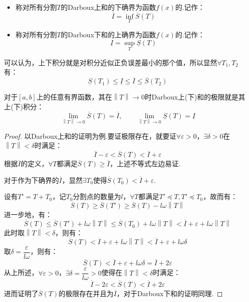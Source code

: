 \begin{definition}
    \begin{itemize}
        \item 称对所有分割$T$的Darboux上和的下确界为函数$f(x)$的.记作：
        \[\overline{I} = \inf_{T} \overline{S}(T)\]
        \item 称对所有分割$T$的Darboux下和的上确界为函数$f(x)$的.记作：
        \[\underline{I} = \sup_{T} \underline{S}(T)\]
    \end{itemize}
\end{definition}

可以认为，上下积分就是对积分近似正负误差最小的那个值，所以显然$\forall T_1,T_2$有：
\[\underline{S}(T_1) \leqslant \underline{I} \leqslant \overline{I} \leqslant \overline{S}(T_2)\]

\begin{theorem}
    对于$[a,b]$上的任意有界函数，其在$\left\|T\right\| \to 0$时Darboux上(下)和的极限就是其上(下)积分：
    \[\lim_{\left\|T\right\| \to 0}\overline{S}(T) = \overline{I},\qquad \lim_{\left\|T\right\| \to 0}\underline{S}(T) = \underline{I}\]
\end{theorem}

\begin{proof}
    以Darboux上和的证明为例.要证极限存在，就要证$\forall \varepsilon > 0$，$\exists \delta > 0$在$\left\|T\right\| < \delta$时满足：
    \[\overline{I} - \varepsilon < \overline{S}(T) < \overline{I} + \varepsilon\]
    根据$\overline{I}$的定义，$\forall T$都满足$\overline{S}(T) \geqslant \overline{I}$，上述不等式左边易证.

    对于作为下确界的$\overline{I}$，显然$\exists T_0$使得$\overline{S}(T_0) < \overline{I} + \varepsilon$.

    设有$T' = T + T_0$，记$T_0$分割点的数量为$l$，$\forall T$都满足$T' \preceq T,T' \preceq T_0$，故而有：
    \[\overline{S}(T) \geqslant \overline{S}(T') \geqslant \overline{S}(T) - l\omega \left\|T\right\|\]
    进一步地，有：
    \[\overline{S}(T) \leqslant \overline{S}(T') + l\omega\left\|T\right\| \leqslant \overline{S}(T_0) + l\omega\left\|T\right\| < \overline{I} + \varepsilon + l\omega\left\|T\right\|\]
    此时取$\left\|T\right\| < \delta$，则有：
    \[\overline{S}(T) < \overline{I} + \varepsilon + l\omega\left\|T\right\| < \overline{I} + \varepsilon + l\omega\delta\]
    取$\delta = \dfrac{\varepsilon}{l\omega}$，则有：
    \[\overline{S}(T) < \overline{I} + \varepsilon + l\omega\delta = \overline{I} + 2\varepsilon\]
    从上所述，$\forall \varepsilon > 0$，$\exists \delta = \dfrac{\varepsilon}{l\omega} > 0$使得在$\left\|T\right\| < \delta$时满足：
    \[\overline{I} - 2\varepsilon < \overline{S}(T) < \overline{I} + 2\varepsilon\]
    进而证明了$\overline{S}(T)$的极限存在并且为$\overline{I}$，对于Darboux下和的证明同理.
\end{proof}

